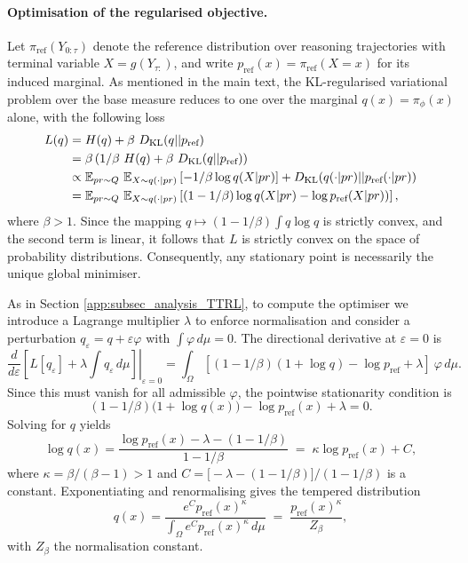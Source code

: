 \paragraph{Optimisation of the regularised objective.} 
Let $\pi_{\mathrm{ref}}(Y_{0:\tau})$ denote the reference distribution over reasoning trajectories with terminal variable
$X=g(Y_{\tau:})$, and write $p_{\mathrm{ref}}(x)=\pi_{\mathrm{ref}}(X=x)$ for its induced marginal.
As mentioned in the main text, the KL-regularised variational problem over the base measure reduces to one over the marginal $q(x) = \pi_\phi(x)$ alone, with the following loss
\begin{align*}
    L(q) &=  H( q) + \beta\ D_{\mathrm{KL}}(q || p_{\text{ref}})\\
    &=  \beta\left(1/\beta\ H( q) + \beta\ D_{\mathrm{KL}}(q || p_{\text{ref}})\right)\\
    &\propto \mathbb{E}_{pr \sim Q}\ \mathbb{E}_{X\sim q(\cdot | pr)}\left[-1/\beta \log q(X | pr)\right] + D_{\mathrm{KL}}(q(\cdot|pr) || p_{\text{ref}}(\cdot | pr))\\
    & =\mathbb{E}_{pr \sim Q}\ \mathbb{E}_{X\sim q(\cdot | pr)}\left[(1-1/\beta) \log q(X | pr)  -\log p_{\text{ref}}(X | pr))\right],
\end{align*}
where $\beta>1$. 
Since the mapping $q\mapsto (1-1/\beta)\int q\log q$ is {strictly} convex, and the second
term is linear, it follows that $L$ is strictly convex on the space of probability distributions. Consequently, any stationary point is necessarily the unique global minimiser.

As in Section \ref{app:subsec_analysis_TTRL}, to compute the optimiser we introduce a Lagrange multiplier $\lambda$ to enforce normalisation and consider a perturbation
$q_\varepsilon = q + \varepsilon\varphi$ with $\int\varphi\,d\mu = 0$.
The directional derivative at $\varepsilon=0$ is
$$
\left.\frac{d}{d\varepsilon}
\left[ L[q_\varepsilon] + \lambda\!\int q_\varepsilon\,d\mu \right]
\right|_{\varepsilon=0}
=
\int_{\Omega}\left[(1-1/\beta)(1+\log q) - \log p_{\text{ref}} + \lambda\right]\ \varphi\,d\mu .
$$
Since this must vanish for all admissible $\varphi$, the pointwise stationarity condition is
$$
(1-1/\beta)\bigl(1+\log q(x)\bigr) - \log p_{\text{ref}}(x) + \lambda = 0.
$$
Solving for $q$ yields
$$
\log q(x)
=
\frac{\log p_{\text{ref}}(x) - \lambda - (1-1/\beta)}{1-1/\beta}
\;=\;
\kappa\log p_{\text{ref}}(x) + C,
$$
where $\kappa = \beta/(\beta-1)>1$ and 
$C=\bigl[-\lambda - (1-1/\beta)\bigr]/(1-1/\beta)$ is a constant.
Exponentiating and renormalising gives the tempered distribution
$$
q(x)=\frac{e^{C} p_{\text{ref}}(x)^{\kappa}}{\int_{\Omega}e^{C} p_{\text{ref}}(x)^{\kappa}\,d\mu}
     \;=\;\frac{ p_{\text{ref}}(x)^{\kappa}}{Z_\beta},
$$
with $Z_\beta$ the normalisation constant. 

